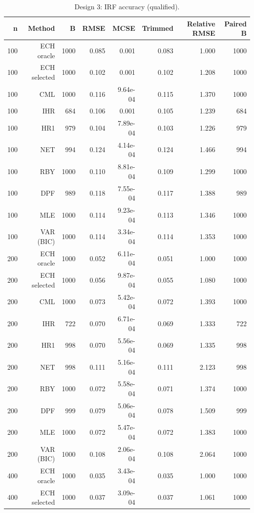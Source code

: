 \begin{table}[p]\centering
\caption{Design 3: IRF accuracy (qualified).}
\small
\begin{tabular}{rrrrrrrr}\toprule
n & Method & B & RMSE & MCSE & Trimmed & Relative RMSE & Paired B \\\midrule
100 & ECH oracle & 1000 & 0.085 & 0.001 & 0.083 & 1.000 & 1000 \\
100 & ECH selected & 1000 & 0.102 & 0.001 & 0.102 & 1.208 & 1000 \\
100 & CML & 1000 & 0.116 & 9.64e-04 & 0.115 & 1.370 & 1000 \\
100 & IHR &  684 & 0.106 & 0.001 & 0.105 & 1.239 &  684 \\
100 & HR1 &  979 & 0.104 & 7.89e-04 & 0.103 & 1.226 &  979 \\
100 & NET &  994 & 0.124 & 4.14e-04 & 0.124 & 1.466 &  994 \\
100 & RBY & 1000 & 0.110 & 8.81e-04 & 0.109 & 1.299 & 1000 \\
100 & DPF &  989 & 0.118 & 7.55e-04 & 0.117 & 1.388 &  989 \\
100 & MLE & 1000 & 0.114 & 9.23e-04 & 0.113 & 1.346 & 1000 \\
100 & VAR (BIC) & 1000 & 0.114 & 3.34e-04 & 0.114 & 1.353 & 1000 \\
200 & ECH oracle & 1000 & 0.052 & 6.11e-04 & 0.051 & 1.000 & 1000 \\
200 & ECH selected & 1000 & 0.056 & 9.87e-04 & 0.055 & 1.080 & 1000 \\
200 & CML & 1000 & 0.073 & 5.42e-04 & 0.072 & 1.393 & 1000 \\
200 & IHR &  722 & 0.070 & 6.71e-04 & 0.069 & 1.333 &  722 \\
200 & HR1 &  998 & 0.070 & 5.56e-04 & 0.069 & 1.335 &  998 \\
200 & NET &  998 & 0.111 & 5.16e-04 & 0.111 & 2.123 &  998 \\
200 & RBY & 1000 & 0.072 & 5.58e-04 & 0.071 & 1.374 & 1000 \\
200 & DPF &  999 & 0.079 & 5.06e-04 & 0.078 & 1.509 &  999 \\
200 & MLE & 1000 & 0.072 & 5.47e-04 & 0.072 & 1.383 & 1000 \\
200 & VAR (BIC) & 1000 & 0.108 & 2.06e-04 & 0.108 & 2.064 & 1000 \\
400 & ECH oracle & 1000 & 0.035 & 3.43e-04 & 0.035 & 1.000 & 1000 \\
400 & ECH selected & 1000 & 0.037 & 3.09e-04 & 0.037 & 1.061 & 1000 \\

\end{tabular}
\end{table}
